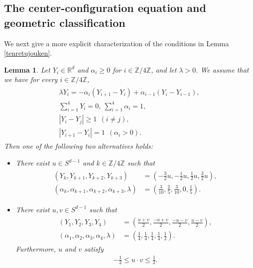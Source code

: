 \documentclass[10pt,a4paper]{amsart}
\newtheorem{lemma}[theorem]{Lemma}
\numberwithin{equation}{section}
\begin{document}
\subsection{The center-configuration equation and geometric classification}

We next give a more explicit characterization of the conditions in Lemma \ref{tenretujouken}.

\begin{lemma}\label{Yhishi}
Let $Y_i\in\mathbb{R}^d$ and $\alpha_i\geq0$ for $i\in\mathbb{Z}/4\mathbb{Z}$, and let $\lambda>0$. We assume that we have for every $i\in\mathbb{Z}/4\mathbb{Z}$,
\begin{align}\label{Yichiass}
\begin{aligned}
\lambda Y_i=-\alpha_i\left(Y_{i+1}-Y_i\right)+\alpha_{i-1}\left(Y_i-Y_{i-1}\right),
\\
\sum_{i=1}^4Y_i=0,\ \sum_{i=1}^4\alpha_i=1,
\\
\left|Y_i-Y_j\right|\geq 1\ \ (i\neq j),
\\
\left|Y_{i+1}-Y_i\right|=1\ \ (\alpha_i>0).
\end{aligned}
\end{align}
Then one of the following two alternatives holds:
\begin{itemize}
\item There exist $u\in S^{d-1}$ and $k\in\mathbb{Z}/4\mathbb{Z}$ such that 
\begin{align}\label{tyokusengata}
\begin{aligned}
\left(Y_k,Y_{k+1},Y_{k+2},Y_{k+3}\right)&=\left(-\frac{3}{2}u,-\frac{1}{2}u,\frac{1}{2}u,\frac{3}{2}u\right),
\\
\left(\alpha_k,\alpha_{k+1},\alpha_{k+2},\alpha_{k+3},\lambda\right)&=\left(\frac{3}{10},\frac{2}{5},\frac{3}{10},0,\frac{1}{5}\right).
\end{aligned}
\end{align}

\item There exist $u,v\in S^{d-1}$ such that 
\begin{align}\label{hishigatagata}
\begin{aligned}
\left(Y_1,Y_2,Y_3,Y_4\right)&=\left(\frac{u+v}{2},\frac{-u+v}{2},\frac{-u-v}{2},\frac{u-v}{2}\right),
\\
\left(\alpha_1,\alpha_2,\alpha_3,\alpha_4,\lambda\right)&=\left(\frac{1}{4},\frac{1}{4},\frac{1}{4},\frac{1}{4},\frac{1}{2}\right).
\end{aligned}
\end{align}
Furthermore, $u$ and $v$ satisfy 
\begin{align}\label{hishigatanaisekijouken}
-\frac{1}{2}\leq u\cdot v\leq \frac{1}{2}.
\end{align}
\end{itemize}
\end{lemma}
\end{document}
